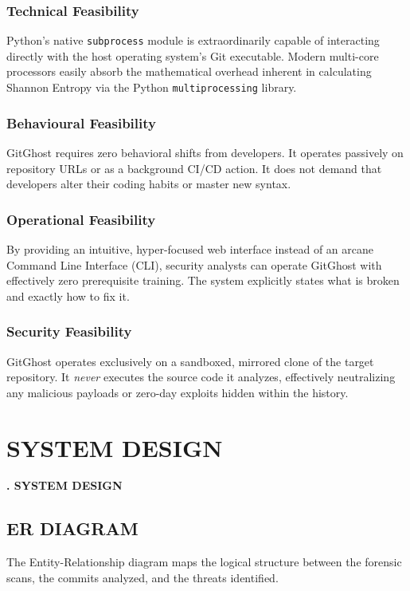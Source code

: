 \documentclass[12pt, a4paper, oneside]{report}
\begin{document}
\subsection{Technical Feasibility}
Python's native \texttt{subprocess} module is extraordinarily capable of interacting directly with the host operating system's Git executable. Modern multi-core processors easily absorb the mathematical overhead inherent in calculating Shannon Entropy via the Python \texttt{multiprocessing} library.

\subsection{Behavioural Feasibility}
GitGhost requires zero behavioral shifts from developers. It operates passively on repository URLs or as a background CI/CD action. It does not demand that developers alter their coding habits or master new syntax.

\subsection{Operational Feasibility}
By providing an intuitive, hyper-focused web interface instead of an arcane Command Line Interface (CLI), security analysts can operate GitGhost with effectively zero prerequisite training. The system explicitly states what is broken and exactly how to fix it.

\subsection{Security Feasibility}
GitGhost operates exclusively on a sandboxed, mirrored clone of the target repository. It \textit{never} executes the source code it analyzes, effectively neutralizing any malicious payloads or zero-day exploits hidden within the history.

\chapter{SYSTEM DESIGN}
\begin{center}
    {\Large \textbf{\thechapter. SYSTEM DESIGN} \par}
\end{center}
\vspace{1cm}

\section{ER DIAGRAM}
The Entity-Relationship diagram maps the logical structure between the forensic scans, the commits analyzed, and the threats identified.
\end{document}
